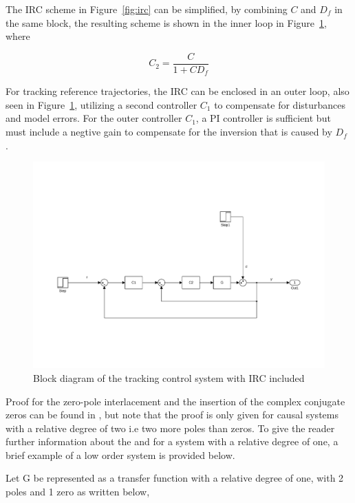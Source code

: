 The IRC scheme in Figure~\ref{fig:irc} can be simplified, by combining $C$ and $D_f$ in the same block, the resulting scheme is shown in the inner loop in Figure~\ref{fig:irc_int}, where

\begin{equation}
  \label{eq:C2}
  C_2 = \frac{C}{1+CD_f}
\end{equation}

For tracking reference trajectories, the IRC can be enclosed in an outer loop, also seen in Figure~\ref{fig:irc_int}, utilizing a second controller $C_1$ to compensate for disturbances and model errors. For the outer controller $C_1$, a PI controller is sufficient but must include a negtive gain to compensate for the inversion that is caused by $D_f$ \citep{gu:2014}.

\begin{figure}[h]
  \centering %
  \includegraphics[width=1\textwidth, trim=4cm 5cm 3.6cm 9.5cm, clip=true]{fig/matlab/irc_int}
  \caption{\label{fig:irc_int}Block diagram of the tracking control system with IRC included}
\end{figure}

Proof for the zero-pole interlacement and the insertion of the complex conjugate zeros can be found in \citep{Aphale:2007}, but note that the proof is only given for causal systems with a relative degree of two i.e two more poles than zeros. To give the reader further information about the \abbrIRC and for a system with a relative degree of one, a brief example of a low order system is provided below.

Let G be represented as a transfer function with a relative degree of one, with 2 poles and 1 zero as written below,

